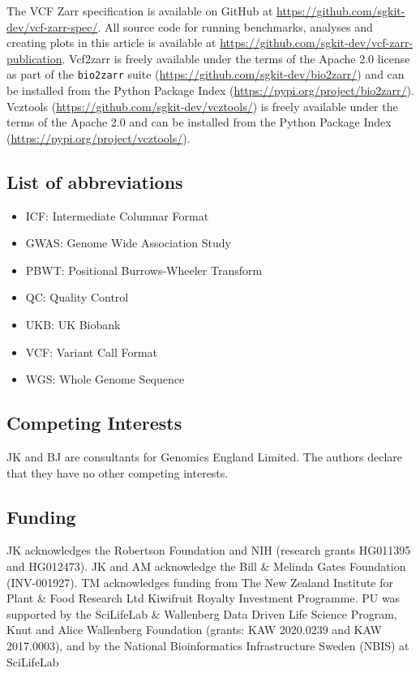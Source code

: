 \documentclass[a4paper,num-refs]{oup-contemporary}
\begin{document}
The VCF Zarr specification is available on GitHub at
\url{https://github.com/sgkit-dev/vcf-zarr-spec/}.
All source code for running benchmarks, analyses and creating
plots in this article is available at
\url{https://github.com/sgkit-dev/vcf-zarr-publication}.
Vcf2zarr is freely available under the terms of the Apache 2.0
license as part of the \texttt{bio2zarr}
suite (\url{https://github.com/sgkit-dev/bio2zarr/})
and can be installed from the Python Package Index
(\url{https://pypi.org/project/bio2zarr/}).
Vcztools (\url{https://github.com/sgkit-dev/vcztools/})
is freely available under the terms of the Apache 2.0
and can be installed from the Python Package Index
(\url{https://pypi.org/project/vcztools/}).

\subsection{List of abbreviations}

\begin{itemize}
    \item ICF: Intermediate Columnar Format
    \item GWAS: Genome Wide Association Study
    \item PBWT: Positional Burrows-Wheeler Transform
    \item QC: Quality Control
    \item UKB: UK Biobank
    \item VCF: Variant Call Format
    \item WGS: Whole Genome Sequence
\end{itemize}

\subsection{Competing Interests}
JK and BJ are consultants for Genomics England Limited.
The authors declare that they have no other competing interests.

\subsection{Funding}
JK acknowledges the Robertson Foundation and
NIH (research grants HG011395 and HG012473).
JK and AM acknowledge the Bill \& Melinda Gates Foundation (INV-001927).
TM acknowledges funding from The New Zealand Institute for Plant \& Food
Research Ltd Kiwifruit Royalty Investment Programme.
PU was supported by the SciLifeLab \& Wallenberg Data Driven Life
Science Program, Knut and Alice Wallenberg Foundation (grants: KAW
2020.0239 and KAW 2017.0003), and by the National Bioinformatics
Infrastructure Sweden (NBIS) at SciLifeLab
\end{document}
